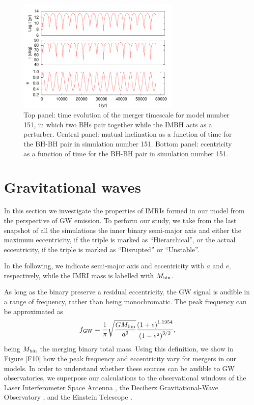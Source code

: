 \documentclass[useAMS,usenatbib]{mn2e}
\newcommand{\gw}{{\rm GW}}
\begin{document}
\begin{figure}
\centering 
\includegraphics[width=8cm]{kozai_151}
\caption{Top panel: time evolution of the merger timescale for model number 151, in which two BHs pair together while the IMBH acts as a perturber. Central panel: mutual inclination as a function of time for the BH-BH pair in simulation number 151. Bottom panel: ecentricity as a function of time for the BH-BH pair in simulation number 151.}
\label{F9}
\end{figure}

\section{Gravitational waves}

In this section we investigate the properties of IMRIs formed in our model from the perspective of GW emission. To perform our study, we take from the last snapshot of all the simulations the inner binary semi-major axis and either the maximum eccentricity, if the triple is marked as ``Hierarchical'', or the actual eccentricity, if the triple is marked as ``Disrupted'' or ``Unstable''.

In the following, we indicate semi-major axis and eccentricity with $a$ and $e$, respectively, while the IMRI mass is labelled with $M_{\rm bin}$.

As long as the binary preserve a residual eccentricity, the GW signal is audible in a range of frequency, rather than being monochromatic. The peak frequency can be approximated as \citep{wen03, antonini12}
\begin{equation}
f_\gw = \frac{1}{\pi}\sqrt{\frac{GM_{\rm bin}}{a^3}}\frac{\left(1+e\right)^{1.1954}}{\left(1-e^2\right)^{3/2}},
\end{equation}  
being $M_{\rm bin}$ the merging binary total mass. Using this definition, we show in Figure \ref{F10} how the peak frequency and eccentricity vary for mergers in our models. In order to understand whether these sources can be audible to GW observatories, we superpose our calculations to the observational windows of the Laser Interferometer Space Antenna \citep[LISA\footnote{\url{https://www.elisascience.org/}},][]{amaro12}, the Deciherz Gravitational-Wave Observatory \citep[DECIGO\footnote{\url{http://tamago.mtk.nao.ac.jp/spacetime/decigo_e.html}},][]{seto01}, and the Einstein Telescope \citep[ET\footnote{\url{http://www.et-gw.eu/}},][]{punturo10}. 
\end{document}
